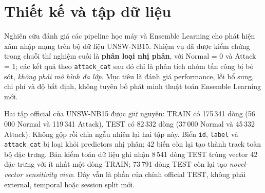 


\section{Thiết kế và tập dữ liệu}
Nghiên cứu đánh giá các pipeline học máy và Ensemble Learning cho phát hiện xâm nhập mạng trên bộ dữ liệu UNSW-NB15\cite{moustafa2015unsw}. Nhiệm vụ đã được kiểm chứng trong chuỗi thí nghiệm cuối là \textbf{phân loại nhị phân}, với Normal = 0 và Attack = 1; các kết quả theo \texttt{attack\_cat} sau đó chỉ là phân tích nhóm tấn công bị bỏ sót, \emph{không phải mô hình đa lớp}. Mục tiêu là đánh giá performance, lỗi bổ sung, chi phí và độ bất định, không tuyên bố phát minh thuật toán Ensemble Learning mới.

Hai tập official của UNSW-NB15 được giữ nguyên: TRAIN có 175\,341 dòng (56\,000 Normal và 119\,341 Attack), TEST có 82\,332 dòng (37\,000 Normal và 45\,332 Attack). Không gộp rồi chia ngẫu nhiên lại hai tập này. Biến \texttt{id}, \texttt{label} và \texttt{attack\_cat} bị loại khỏi predictors nhị phân; 42 biến còn lại tạo thành track toàn bộ đặc trưng. Bản kiểm toán dữ liệu ghi nhận 8\,541 dòng TEST trùng vector 42 đặc trưng với ít nhất một dòng TRAIN; 73\,791 dòng TEST còn lại tạo \emph{novel-vector sensitivity view}. Đây vẫn là phần của chính official TEST, không phải external, temporal hoặc session split mới.

